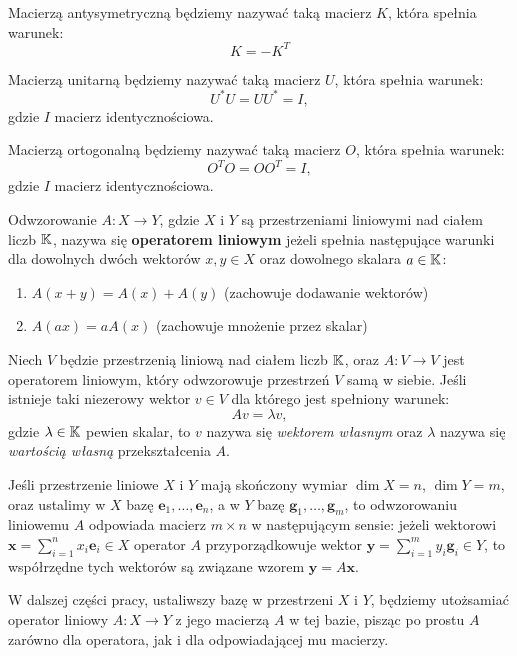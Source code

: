 \begin{definition}
    Macierzą antysymetryczną będziemy nazywać taką macierz $K$, która spełnia warunek:
    $$K = -K^T$$
\end{definition}

\begin{definition}
    Macierzą unitarną będziemy nazywać taką macierz $U$, która spełnia warunek:
    $$U^*U = UU^* = I,$$
    gdzie $I$ macierz identycznościowa.
\end{definition}

\begin{definition}
    Macierzą ortogonalną będziemy nazywać taką macierz $O$, która spełnia warunek:
    $$O^TO = OO^T = I,$$
    gdzie $I$ macierz identycznościowa.
\end{definition}

\begin{definition}
Odwzorowanie $A \colon X \to Y $, gdzie $X$ i $Y$ są przestrzeniami liniowymi nad ciałem liczb $\mathbb{K}$, nazywa się \textbf{operatorem liniowym} jeżeli spełnia następujące warunki dla dowolnych dwóch wektorów $x, y \in X$ oraz dowolnego skalara $a \in \mathbb{K}$:
\begin{enumerate}[leftmargin=1cm, itemsep=2pt, label=(\arabic*)]
    \item $A(x + y) = A(x) + A(y)$ (zachowuje dodawanie wektorów)
    \item $A(ax) = aA(x)$ (zachowuje mnożenie przez skalar)
\end{enumerate}
\end{definition}

\begin{definition}
    Niech $V$ będzie przestrzenią liniową nad ciałem liczb $\mathbb{K}$, oraz $A \colon V \to V$ jest operatorem liniowym, który odwzorowuje przestrzeń $V$ samą w siebie. Jeśli istnieje taki niezerowy wektor $v \in V$ dla którego jest spełniony warunek:
    $$ Av = \lambda v,$$
    gdzie $\lambda \in \mathbb{K}$ pewien skalar, to $v$ nazywa się \textit{wektorem własnym} oraz $\lambda$ nazywa się \textit{wartością własną} przekształcenia $A$.
\end{definition}

Jeśli przestrzenie liniowe $X$ i $Y$ mają skończony wymiar $\dim X = n$, $\dim Y = m$, oraz ustalimy w $X$ bazę $\mathbf{e}_1, \ldots, \mathbf{e}_n$, a w $Y$ bazę $\mathbf{g}_1, \ldots, \mathbf{g}_m$, to odwzorowaniu liniowemu $A$ odpowiada macierz $m \times n$ w następującym sensie: jeżeli wektorowi $\mathbf{x} = \sum_{i=1}^{n} x_i \mathbf{e}_i \in X$ operator $A$ przyporządkowuje wektor $\mathbf{y} = \sum_{i=1}^{m} y_i \mathbf{g}_i \in Y$, to współrzędne tych wektorów są związane wzorem $\mathbf{y} = A\mathbf{x}.$
\begin{remark}
W dalszej części pracy, ustaliwszy bazę w przestrzeni $X$ i $Y$, będziemy utożsamiać operator liniowy $A \colon X \to Y$ z jego macierzą $A$ w tej bazie, pisząc po prostu $A$ zarówno dla operatora, jak i dla odpowiadającej mu macierzy.
\end{remark}